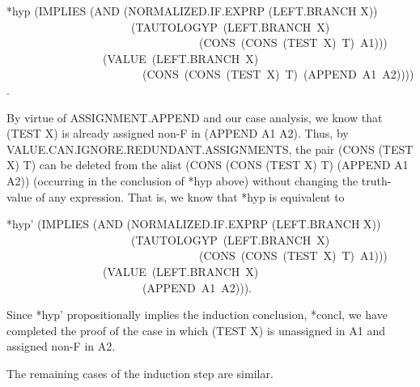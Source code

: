 \documentclass[10pt]{book}
\newenvironment{pubasis}{\begin{flushleft}}{\end{flushleft}}
\begin{document}
\begin{pubasis}
*hyp	(IMPLIES (AND (NORMALIZED.IF.EXPRP (LEFT.BRANCH X))\\
~~~~~~~~~~~~~~~~~~~~~~(TAUTOLOGYP~(LEFT.BRANCH~X)\\
~~~~~~~~~~~~~~~~~~~~~~~~~~~~~~~~~~(CONS~(CONS~(TEST~X)~T)~A1)))\\
~~~~~~~~~~~~~~~~~(VALUE~(LEFT.BRANCH~X)\\
~~~~~~~~~~~~~~~~~~~~~~~~(CONS~(CONS~(TEST~X)~T)~(APPEND~A1~A2)))).\\
\end{pubasis}
By virtue of ASSIGNMENT.APPEND and our case analysis, we know that
(TEST X) is already assigned non-F in (APPEND A1 A2).  Thus, by VALUE.CAN.IGNORE.REDUNDANT.ASSIGNMENTS,
the pair
(CONS (TEST X) T) can be deleted from the alist (CONS (CONS (TEST X) T) (APPEND A1 A2))
(occurring in the conclusion of *hyp above)
without changing the truth-value of any expression.
That is, we know that *hyp is equivalent to
\begin{pubasis}
*hyp'	(IMPLIES (AND (NORMALIZED.IF.EXPRP (LEFT.BRANCH X))\\
~~~~~~~~~~~~~~~~~~~~~~(TAUTOLOGYP~(LEFT.BRANCH~X)\\
~~~~~~~~~~~~~~~~~~~~~~~~~~~~~~~~~~(CONS~(CONS~(TEST~X)~T)~A1)))\\
~~~~~~~~~~~~~~~~~(VALUE~(LEFT.BRANCH~X)\\
~~~~~~~~~~~~~~~~~~~~~~~~(APPEND~A1~A2))).\\
\end{pubasis}
Since *hyp' propositionally implies the induction conclusion, *concl, we have
completed the proof of the case in which (TEST X) is unassigned in A1 and
assigned non-F in A2.

The remaining cases of the induction step are similar.
\end{document}
